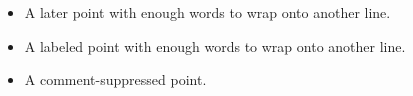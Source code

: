 \begin{itemize}
  \item<2-> A later point with enough words to wrap
        onto another line.
  \item<3->[Note] A labeled point with enough words
        to wrap onto another line.
  \item<4->%
        A comment-suppressed point.
\end{itemize}
